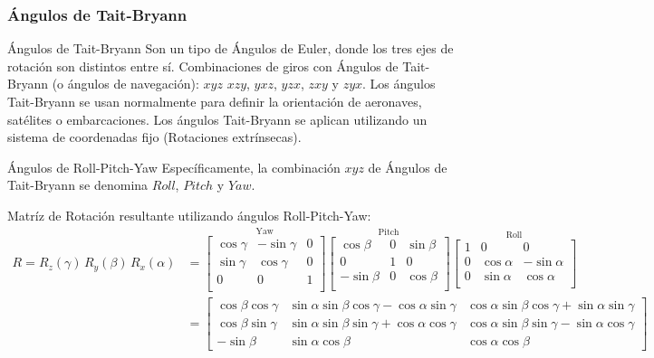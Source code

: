 \begin{frame}
    \frametitle{Ángulos de Tait-Bryann}
    \small
    \begin{block}{Ángulos de Tait-Bryann}
        Son un tipo de Ángulos de Euler, donde los tres ejes de rotación son distintos entre sí. Combinaciones de giros con Ángulos de Tait-Bryann (o ángulos de navegación): $xyz$ $xzy$, $yxz$, $yzx$, $zxy$ y $zyx$. Los ángulos Tait-Bryann se usan normalmente para definir la orientación de aeronaves, satélites o embarcaciones. Los ángulos Tait-Bryann se aplican utilizando un sistema de coordenadas fijo (Rotaciones extrínsecas).
    \end{block}
    
    \begin{block}{Ángulos de Roll-Pitch-Yaw}
        Específicamente, la combinación $xyz$ de Ángulos de Tait-Bryann se denomina $Roll$, $Pitch$ y $Yaw$.
    \end{block}
    
    Matríz de Rotación resultante utilizando ángulos Roll-Pitch-Yaw:
    \scriptsize
    \begin{align*}
        R = R_{z}(\gamma) \, R_{y}(\beta) \, R_{x}(\alpha) &=
        \overset {\text{Yaw}}{
        \begin{bmatrix}
            \cos \gamma & -\sin \gamma & 0\\
            \sin \gamma & \cos \gamma &0\\
            0 & 0 & 1\\
        \end{bmatrix}}
        \overset {\text{Pitch}}{
        \begin{bmatrix}
            \cos \beta &0&\sin \beta\\
            0 & 1 & 0\\
            -\sin \beta &0&\cos \beta\\
        \end{bmatrix}}
        \overset {\text{Roll}}{
        \begin{bmatrix}
            1 & 0 & 0 \\
            0 & \cos \alpha & -\sin \alpha \\
            0& \sin \alpha & \cos \alpha \\
        \end{bmatrix}}\\
        &=
        \begin{bmatrix}
            \cos \beta \cos \gamma & \sin \alpha \sin \beta \cos \gamma - \cos \alpha \sin \gamma & \cos \alpha \sin \beta \cos \gamma + \sin \alpha \sin \gamma \\
            \cos \beta \sin \gamma & \sin \alpha \sin \beta \sin \gamma + \cos \alpha \cos \gamma & \cos \alpha \sin \beta \sin \gamma - \sin \alpha \cos \gamma \\
            -\sin \beta & \sin \alpha \cos \beta & \cos \alpha \cos \beta
        \end{bmatrix}
    \end{align*}
    

\end{frame}
